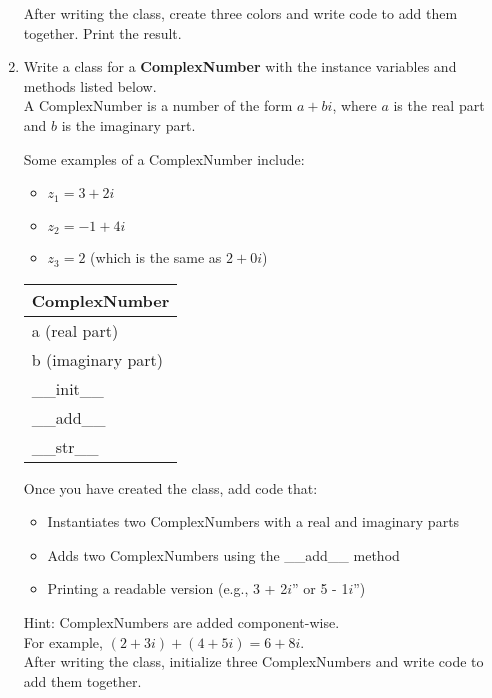 \documentclass{article}
\newcommand{\csq}[1]{\reflectbox{''}#1''}  %
\begin{document}
\begin{enumerate}
		After writing the class, create three colors and write code to add them together.
		Print the result.

	

	\item
		Write a class for a \textbf{ComplexNumber} with the instance variables and methods listed 
		below.\\
		A ComplexNumber is a number of the form $a + bi$, where $a$ is the real part and $b$ is 
		the imaginary part.
			
		\begin{minipage}[t]{0.7\textwidth}
			Some examples of a ComplexNumber include:
			\begin{itemize}
				\item $z_1 = 3 + 2i$
				\item $z_2 = -1 + 4i$
				\item $z_3 = 2$ (which is the same as $2 + 0i$)
			\end{itemize}

		\end{minipage}
		\hfill
		\begin{minipage}[t]{0.25\textwidth}
			\vspace{.2em}
			\begin{flushright}
				\begin{tabular}{|l|}
					\hline
					ComplexNumber \\ \hline
					a (real part) \\
					b (imaginary part) \\ \hline
					\_\_init\_\_ \\
					\_\_add\_\_ \\
					\_\_str\_\_ \\ \hline
				\end{tabular}
			\end{flushright}
		\end{minipage}
		
		Once you have created the class, add code that:
		\begin{itemize}
			\item Instantiates two ComplexNumbers with a real and imaginary parts
			\item Adds two ComplexNumbers using the \_\_add\_\_ method
			\item Printing a readable version (e.g., \csq{3 + 2$i$} or \csq{5 - 1$i$})
		\end{itemize}
		
		Hint: ComplexNumbers are added component-wise.\\
		For example, $(2 + 3i) + (4 + 5i) = 6 + 8i$.\\
		
		After writing the class, initialize three ComplexNumbers and write code to add them 
		together.



\end{enumerate}
\end{document}
